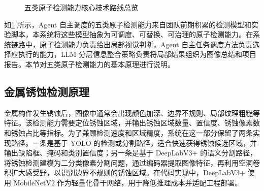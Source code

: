 \begin{figure}[!htb]
{%
  }
  \caption{五类原子检测能力核心技术路线总览}
  \label{fig:foundation-atomic-detection-capability-technical-routes}
\end{figure}

如\cref{fig:foundation-atomic-detection-capability-technical-routes} 所示，Agent 自主调度的五类原子检测能力来自团队前期积累的检测模型和实验脚本，本系统将这些模型抽象为可调度、可替换、可治理的原子检测能力。在系统链路中，原子检测能力负责给出局部视觉判断，Agent 自主任务调度方法负责选择应执行的能力，LLM 分层信息整合策略负责将局部结果组织为图像总结和项目报告。本节对五类原子检测能力的基本原理进行说明。

\subsection{金属锈蚀检测原理}
\label{sec:foundation-metal-corrosion-detection-principle}

金属构件发生锈蚀后，图像中通常会出现颜色加深、边界不规则、局部纹理粗糙等特征。该检测能力需要定位锈蚀区域，并输出锈蚀区域数量、置信度、锈蚀像素数和锈蚀占比等指标。为了兼顾检测速度和区域精度，系统在这一部分保留了两条实现路径。一条是基于 YOLO 的检测或分割路径，适合快速获得锈蚀候选区域，并输出缺陷框、掩码和类别置信度；另一条是基于 DeepLabV3+ 的语义分割路径，将锈蚀检测建模为二分类像素分割问题，通过编码器提取图像特征，再利用空洞卷积扩大感受野，以识别边界不规则的锈蚀区域\cite{chen2018deeplabv3plus}。在代码实现中，DeepLabV3+ 使用 MobileNetV2 作为轻量化骨干网络，用于降低推理成本并适配工程部署\cite{sandler2018mobilenetv2}。

